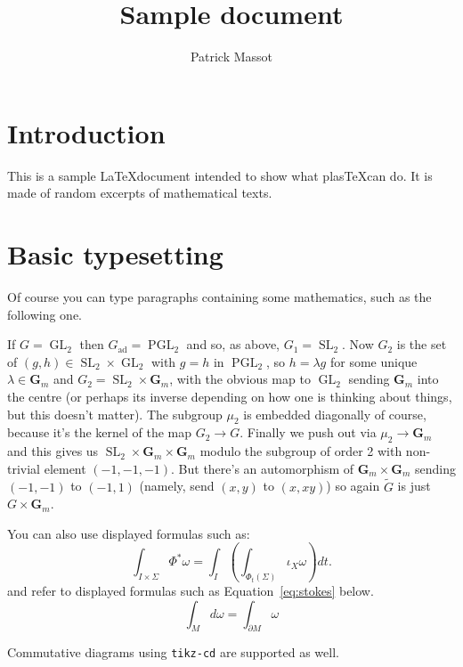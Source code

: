 \documentclass{article}
\title{Sample document}
\author{Patrick Massot}
\DeclareMathOperator{\GL}{GL}
\DeclareMathOperator{\PGL}{PGL}
\DeclareMathOperator{\SL}{SL}
\DeclareMathOperator{\ad}{ad}
\newcommand{\Gad}{{G_{\ad}}}
\newcommand{\Gm}{\mathbf{G}_m}
\newcommand{\Gtilde}{{\tilde{G}}}
\begin{document}
\maketitle

\section*{Introduction}

This is a sample \LaTeX document intended to show what plas\TeX can do. It is
made of random excerpts of mathematical texts.


\section{Basic typesetting}

Of course you can type paragraphs containing some mathematics, such as the following one.

If $G=\GL_2$ then $\Gad=\PGL_2$ and so, as above, $G_1=\SL_2$.
Now $G_2$ is the set of $(g,h)\in\SL_2\times\GL_2$ with $g=h$ in $\PGL_2$,
so $h=\lambda g$ for some unique $\lambda\in\Gm$ and $G_2=\SL_2\times\Gm$,
with the obvious map to $\GL_2$ sending $\Gm$ into the centre
(or perhaps its inverse depending on how one is thinking
about things, but this doesn't matter). The subgroup $\mu_2$
is embedded diagonally of course, because it's the kernel
of the map $G_2\to G$. Finally we push out via $\mu_2\to\Gm$
and this gives us $\SL_2\times\Gm\times\Gm$ modulo
the subgroup of order 2 with non-trivial element $(-1,-1,-1)$.
But there's an automorphism of $\Gm\times\Gm$ sending $(-1,-1)$
to $(-1,1)$ (namely, send $(x,y)$ to $(x,xy)$) so again
$\Gtilde$ is just $G\times\Gm$.

You can also use displayed formulas such as:
\[
	\int_{I \times \Sigma} \Phi^*\omega = \int_I\left(\int_{\Phi_t(\Sigma)} \iota_X \omega\right)dt.
\]
and refer to displayed formulas such as Equation~\ref{eq:stokes} below.
\begin{equation}\label{eq:stokes}
  \int_M d\omega = \int_{\partial M} \omega
\end{equation}

Commutative diagrams using \verb+tikz-cd+ are supported as well.

\begin{center}
\end{center}
\end{document}
